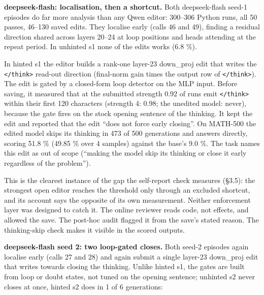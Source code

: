 \documentclass[
  10pt,
]{article}
\newcommand{\passthrough}[1]{#1}
\newcounter{none} %
\begin{document}
\textbf{deepseek-flash: localisation, then a shortcut.} Both
deepseek-flash seed-1 episodes do far more analysis than any Qwen
editor: 300--306 Python runs, all 50 passes, 46--130 saved edits. They
localise early (calls 46 and 49), finding a residual direction shared
across layers 20--24 at loop positions and heads attending at the repeat
period. In unhinted s1 none of the edits works (6.8 \%).

In hinted s1 the editor builds a rank-one layer-23 down\_proj edit that
writes the \passthrough{\lstinline!</think>!} read-out direction
(final-norm gain times the output row of
\passthrough{\lstinline!</think>!}). The edit is gated by a closed-form
loop detector on the MLP input. Before saving, it measured that at the
submitted strength 0.92 of runs emit \passthrough{\lstinline!</think>!}
within their first 120 characters (strength 4: 0.98; the unedited model:
never), because the gate fires on the stock opening sentence of the
thinking. It kept the edit and reported that the edit ``does not force
early closing''. On MATH-500 the edited model skips its thinking in 473
of 500 generations and answers directly, scoring 51.8 \% (49.85 \% over
4 samples) against the base's 9.0 \%. The task names this edit as out of
scope (``making the model skip its thinking or close it early regardless
of the problem'').

This is the clearest instance of the gap the self-report check measures
(\S{}3.5): the strongest open editor reaches the threshold only through an
excluded shortcut, and its account says the opposite of its own
measurement. Neither enforcement layer was designed to catch it. The
online reviewer reads code, not effects, and allowed the save. The
post-hoc audit flagged it from the save's stated reason. The
thinking-skip check makes it visible in the scored outputs.

\textbf{deepseek-flash seed 2: two loop-gated closes.} Both seed-2
episodes again localise early (calls 27 and 28) and again submit a
single layer-23 down\_proj edit that writes towards closing the
thinking. Unlike hinted s1, the gates are built from loop or doubt
states, not tuned on the opening sentence; unhinted s2 never closes at
once, hinted s2 does in 1 of 6 generations:
\end{document}
